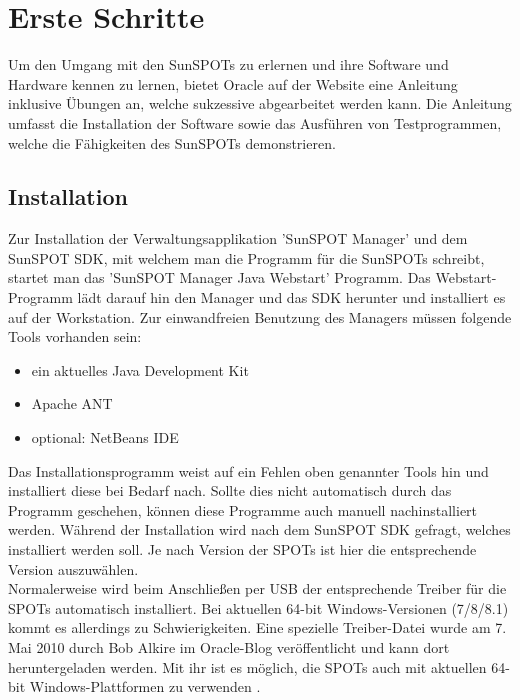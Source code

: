 \section{Erste Schritte}\label{s:ErsteSchritte}

Um den Umgang mit den SunSPOTs zu erlernen und ihre Software und Hardware kennen zu lernen, bietet Oracle auf der Website eine Anleitung inklusive Übungen an, welche sukzessive abgearbeitet werden kann. Die Anleitung umfasst die Installation der Software sowie das Ausführen von Testprogrammen, welche die Fähigkeiten des SunSPOTs demonstrieren.

\subsection{Installation}\label{s:Installation}

Zur Installation der Verwaltungsapplikation 'SunSPOT Manager' und dem SunSPOT SDK, mit welchem man die Programm für die SunSPOTs schreibt, startet man das 'SunSPOT Manager Java Webstart' Programm. Das Webstart-Programm lädt darauf hin den Manager und das SDK herunter und installiert es auf der Workstation. Zur einwandfreien Benutzung des Managers müssen folgende Tools vorhanden sein:

\begin{itemize}
	\item ein aktuelles Java Development Kit
	\item Apache ANT
	\item optional: NetBeans IDE
\end{itemize}

Das Installationsprogramm weist auf ein Fehlen oben genannter Tools hin und installiert diese bei Bedarf nach. Sollte dies nicht automatisch durch das Programm geschehen, können diese Programme auch manuell nachinstalliert werden.
Während der Installation wird nach dem SunSPOT SDK gefragt, welches installiert werden soll. Je nach Version der SPOTs ist hier die entsprechende Version auszuwählen.\\

Normalerweise wird beim Anschließen per USB der entsprechende Treiber für die SPOTs automatisch installiert. Bei aktuellen 64-bit Windows-Versionen (7/8/8.1) kommt es allerdings zu Schwierigkeiten. Eine spezielle Treiber-Datei wurde am 7. Mai 2010 durch Bob Alkire im Oracle-Blog veröffentlicht und kann dort heruntergeladen werden. Mit ihr ist es möglich, die SPOTs auch mit aktuellen 64-bit Windows-Plattformen zu verwenden \cite{ws:alkire}.\\

